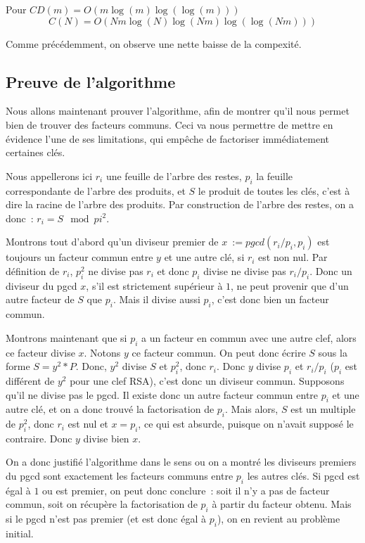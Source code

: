 \documentclass[a4paper,10pt]{article}
\begin{document}
  Pour $CD(m) = O(m\log(m)\log(\log(m)))$
  \[
   C(N) = O(Nm\log(N)\log(Nm)\log(\log(Nm)))
  \]
  
  Comme précédemment, on observe une nette baisse de la compexité.
  
  \subsection{Preuve de l'algorithme}
  Nous allons maintenant prouver l'algorithme, afin de montrer qu'il nous permet bien de trouver des facteurs communs.
  Ceci va nous permettre de mettre en évidence l'une de ses limitations, qui empêche de factoriser immédiatement certaines clés.
  
  Nous appellerons ici $r_i$ une feuille de l'arbre des restes, $p_i$ la feuille correspondante de l'arbre des produits, et $S$ le produit de toutes les clés, c'est à dire la racine de l'arbre des produits.
  Par construction de l'arbre des restes, on a donc~: $r_i = S \mod pi^2$.
  
  Montrons tout d'abord qu'un diviseur premier de $x~:= pgcd(r_i/p_i,p_i)$ est toujours un facteur commun entre $y$ et une autre clé, si $r_i$ est non nul. Par définition de $r_i$, $p_i^2$ ne divise pas $r_i$ et donc $p_i$ divise ne divise pas $r_i/p_i$. Donc un diviseur du pgcd $x$, s'il est strictement supérieur à $1$, ne peut provenir que d'un autre facteur de $S$ que $p_i$. Mais il divise aussi $p_i$, c'est donc bien un facteur commun.
  
  Montrons maintenant que si $p_i$ a un facteur en commun avec une autre clef, alors ce facteur divise $x$. Notons $y$ ce facteur commun. On peut donc écrire $S$ sous la forme $S = y^2*P$. Donc, $y^2$ divise $S$ et $p_i^2$, donc $r_i$.
  Donc $y$ divise $p_i$ et $r_i/p_i$ ($p_i$ est différent de $y^2$ pour une clef RSA), c'est donc un diviseur commun.
  Supposons qu'il ne divise pas le pgcd. Il existe donc un autre facteur commun entre $p_i$ et une autre clé, et on a donc trouvé la factorisation de $p_i$. Mais alors, $S$ est un multiple de $p_i^2$, donc $r_i$ est nul et $x = p_i$, ce qui est absurde, puisque on n'avait supposé le contraire. Donc $y$ divise bien $x$.
  
  On a donc justifié l'algorithme dans le sens ou on a montré les diviseurs premiers du pgcd sont exactement les facteurs communs entre $p_i$ les autres clés. Si pgcd est égal à $1$ ou est premier, on peut donc conclure~: soit il n'y a pas de facteur commun, soit on récupère la factorisation de $p_i$ à partir du facteur obtenu. Mais si le pgcd n'est pas premier (et est donc égal à $p_i$), on en revient au problème initial.
  
\end{document}
